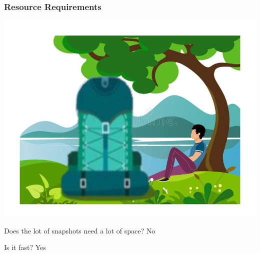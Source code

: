 \documentclass[aspectratio=169]{beamer}
\begin{document}
\begin{frame}
\frametitle<presentation>{Resource Requirements}
  
\noindent\begin{minipage}{0.6\textwidth}%
\includegraphics[width=\linewidth]{pictures/resting-under-tree+big_pack.png}
\end{minipage}%
\hfill%
\begin{minipage}{0.4\textwidth}\raggedleft

\begin{block}{Does the lot of snapshots need a lot of space?}
No
\end{block}


\begin{block}{Is it fast?}
Yes 
\end{block}

\end{minipage}
  
\end{frame}
\end{document}

